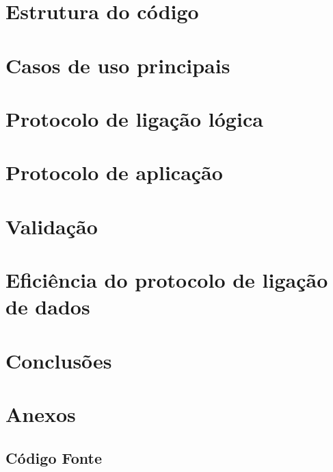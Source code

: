 \documentclass[a4paper,11pt,portuguese]{article}
\begin{document}


\section{Estrutura do código}



\section{Casos de uso principais}



\section{Protocolo de ligação lógica}



\section{Protocolo de aplicação}



\section{Validação}



\section{Eficiência do protocolo de ligação de dados}



\section{Conclusões}



\newpage

\section{Anexos}
\subsection{Código Fonte}












\end{document}
